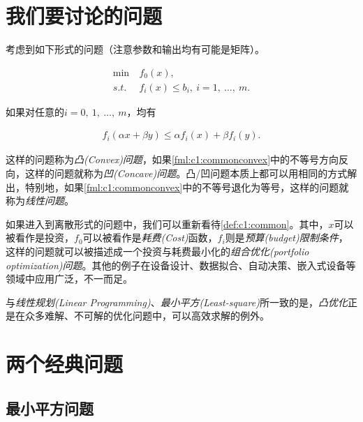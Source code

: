 \section{我们要讨论的问题}
考虑到如下形式的问题（注意参数和输出均有可能是矩阵）。

\begin{problem}[普适优化问题] \label{def:c1:common}
  \begin{subequations}
  	\renewcommand{\theequation}
  	{\theparentequation-\arabic{equation}}
  	\begin{align}
  	  \min~&f_0 (x),\label{fml:c1:common}\\ 
  	  s.t.~&f_i (x) \leqslant b_i,~i=1,~\ldots,~m. \label{fml:c1:commonconst}
  	\end{align}
  \end{subequations}
\end{problem}

如果对任意的$i=0,~1,~\ldots,~m$，均有

\begin{align} \label{fml:c1:commonconvex}
	f_i(\alpha x + \beta y) \leqslant \alpha f_i(x) + \beta f_i(y).
\end{align}

这样的问题称为\emph{凸(Convex)问题}，如果\eqref{fml:c1:commonconvex}中的不等号方向反向，这样的问题就称为\emph{凹(Concave)问题}。凸/凹问题本质上都可以用相同的方式解出，特别地，如果\eqref{fml:c1:commonconvex}中的不等号退化为等号，这样的问题就称为\emph{线性问题}。

如果进入到离散形式的问题中，我们可以重新看待\autoref{def:c1:common}。其中，$x$可以被看作是投资，$f_0$可以被看作是\emph{耗费(Cost)}函数，$f_i$则是\emph{预算(budget)限制条件}，这样的问题就可以被描述成一个投资与耗费最小化的\emph{组合优化(portfolio optimization)问题}。其他的例子在设备设计、数据拟合、自动决策、嵌入式设备等领域中应用广泛，不一而足。

与\emph{线性规划(Linear Programming)}、\emph{最小平方(Least-square)}所一致的是，\emph{凸优化}正是在众多难解、不可解的优化问题中，可以高效求解的例外。

\section{两个经典问题}

\subsection{最小平方问题}
\label{c1:minsquare}

